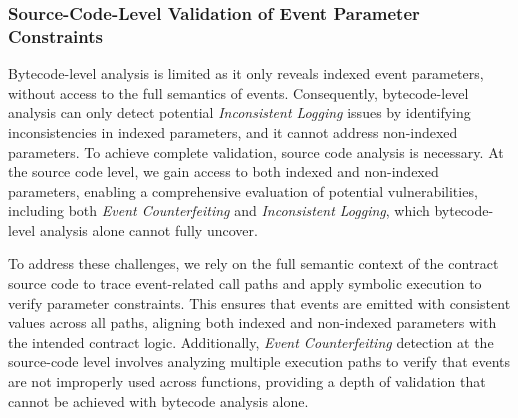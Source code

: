\subsubsection{Source-Code-Level Validation of Event Parameter Constraints}

Bytecode-level analysis is limited as it only reveals indexed event parameters, without access to the full semantics of events.
Consequently, bytecode-level analysis can only detect potential \emph{Inconsistent Logging} issues by identifying inconsistencies in indexed parameters, and it cannot address non-indexed parameters.
To achieve complete validation, source code analysis is necessary.
At the source code level, we gain access to both indexed and non-indexed parameters, enabling a comprehensive evaluation of potential vulnerabilities, including both \emph{Event Counterfeiting} and \emph{Inconsistent Logging}, which bytecode-level analysis alone cannot fully uncover.

To address these challenges, we rely on the full semantic context of the contract source code to trace event-related call paths and apply symbolic execution to verify parameter constraints.
This ensures that events are emitted with consistent values across all paths, aligning both indexed and non-indexed parameters with the intended contract logic. Additionally, \emph{Event Counterfeiting} detection at the source-code level involves analyzing multiple execution paths to verify that events are not improperly used across functions, providing a depth of validation that cannot be achieved with bytecode analysis alone.

